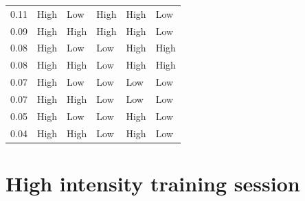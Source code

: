 \documentclass[man,floatsintext]{apa6}
\begin{document}
\begin{table}[H]
\begin{center}
\begin{threeparttable}
\begin{tabular}{llllll}
0.11 & High & Low & High & High & Low\\
0.09 & High & High & High & High & Low\\
0.08 & High & Low & Low & High & High\\
0.08 & High & High & Low & High & High\\
0.07 & High & Low & Low & Low & Low\\
0.07 & High & High & Low & Low & Low\\
0.05 & High & Low & Low & High & Low\\
0.04 & High & High & Low & High & Low\\
\bottomrule
\end{tabular}

\end{threeparttable}
\end{center}

\end{table}

\hypertarget{high-intensity-training-session}{%
\section{High intensity training session}\label{high-intensity-training-session}}

\end{document}
